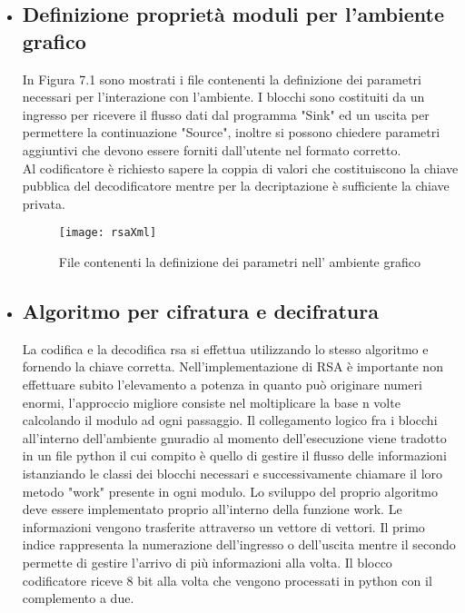 \begin{itemize}

\item \subsection{Definizione proprietà moduli per l'ambiente grafico}
In Figura 7.1 sono mostrati i file contenenti la definizione dei parametri necessari per l'interazione con l'ambiente. I blocchi sono costituiti da un ingresso per ricevere il flusso dati dal programma "Sink" ed un uscita per permettere la continuazione "Source", inoltre si possono chiedere parametri aggiuntivi che devono essere forniti dall'utente nel formato corretto.
\\Al codificatore è richiesto sapere la coppia di valori che costituiscono la chiave pubblica del decodificatore mentre per la decriptazione è sufficiente la chiave privata.
\begin{figure}[h]
	\raggedleft
	\texttt{[image: rsaXml]}
	\caption{File contenenti la definizione dei parametri nell' ambiente grafico}
\end{figure}
\item \subsection{Algoritmo per cifratura e decifratura}
La codifica e la decodifica rsa si effettua utilizzando lo stesso algoritmo e fornendo la chiave corretta. Nell'implementazione di RSA è importante non effettuare subito l'elevamento a potenza in quanto può originare numeri enormi, l'approccio migliore consiste nel  moltiplicare la base n volte calcolando il modulo ad ogni passaggio.
Il collegamento logico fra i blocchi all'interno dell'ambiente gnuradio al momento dell'esecuzione viene tradotto in un file python il cui compito è quello di gestire il flusso delle informazioni istanziando le classi dei blocchi necessari e successivamente chiamare il loro metodo "work" presente in ogni modulo.
 Lo sviluppo del proprio algoritmo deve essere implementato proprio all'interno della funzione work.
 Le informazioni vengono trasferite attraverso un vettore di vettori. Il primo indice rappresenta la numerazione dell'ingresso o dell'uscita mentre il secondo permette di gestire l'arrivo di più informazioni alla volta.
Il blocco codificatore riceve 8 bit alla volta che vengono processati in python con il complemento a due. 
\begin{figure}[h]
	\centering

\end{figure}
\end{itemize}
